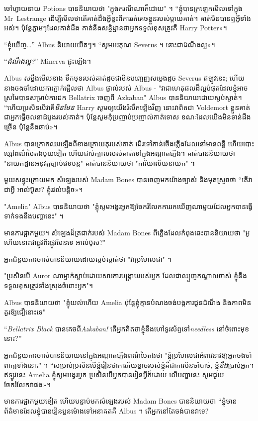 ចៅហ្វាយនាយ Potions បាននិយាយថា "ក្នុងករណីណាក៏ដោយ" ។ “ខ្ញុំបានក្រឡេកមើលទៅក្នុង Mr~Lestrange ដើម្បីមើលថាតើគាត់ដឹងអ្វីខ្លះពីការរត់គេចខ្លួនរបស់ម្តាយគាត់។ គាត់មិនបានឮអ្វីទាំងអស់។ ប៉ុន្តែ​ភ្លាមៗ​ដែល​គាត់​ដឹង គាត់​នឹង​សន្និដ្ឋាន​ថា​អ្នក​ទទួលខុសត្រូវ​គឺ Harry Potter»។

“ខ្ញុំឃើញ…” Albus និយាយយឺតៗ។ “សូមអរគុណ Severus ។ នោះ​ជា​ដំណឹង​ល្អ»។

“\emph{ដំណឹងល្អ?}” Minerva ផ្ទុះឡើង។

Albus សម្លឹងមើលនាង ទឹកមុខរបស់គាត់ដូចជាមិនបញ្ចេញសម្លេងដូច Severus ឥឡូវនេះ; ហើយនាងចងចាំដោយការភ្ញាក់ផ្អើលថា Albus ផ្ទាល់របស់ Albus - "វាជាហេតុផលដ៏ល្អបំផុតដែលខ្ញុំអាចស្រមៃបានសម្រាប់ការដក Bellatrix ចេញពី Azkaban" Albus បាននិយាយដោយស្ងប់ស្ងាត់។ “ហើយប្រសិនបើវាគឺ\emph{មិនមែន} Harry សូមឲ្យយើងរំលឹកឡើងវិញ នោះវាពិតជា Voldemort ខ្លួនគាត់ជាអ្នកធ្វើចលនាដំបូងរបស់គាត់។ ប៉ុន្តែ​សូម​កុំ​ប្រញាប់​ប្រញាល់​កាត់​ទោស ខណៈ​ដែល​យើង​មិន​ទាន់​ដឹង​ច្រើន ប៉ុន្តែ​នឹង​ឆាប់»។

Albus បានក្រោកឈរឡើងពីខាងក្រោយតុរបស់គាត់ ដើរទៅកាន់ចើងភ្លើងដែលនៅមានពន្លឺ ហើយបោះម្សៅពណ៌បៃតងមួយទៀត ហើយជាប់ក្បាលរបស់គាត់ទៅក្នុងអណ្តាតភ្លើង។ គាត់បាននិយាយថា "នាយកដ្ឋានអនុវត្តច្បាប់វេទមន្ត" គាត់បាននិយាយថា "ការិយាល័យនាយក" ។

មួយសន្ទុះក្រោយមក សំឡេងរបស់ Madam Bones បានចេញមកយ៉ាងច្បាស់ និងមុតស្រួចថា “តើវាជាអ្វី អាល់ប៊ូស? ខ្ញុំ​រវល់​បន្តិច»។

"Amelia" Albus បាននិយាយថា "ខ្ញុំសូមអង្វរអ្នកឱ្យចែករំលែកការរកឃើញណាមួយដែលអ្នកបានធ្វើទាក់ទងនឹងបញ្ហានេះ" ។

មានការផ្អាកមួយ។ សំឡេងដ៏ត្រជាក់របស់ Madam Bones ពីភ្លើងដែលកំពុងឆេះបាននិយាយថា "អូ ហើយនោះជាផ្លូវពីរផ្លូវមែនទេ អាល់ប៊ូស?"

អ្នកជំនួយការចាស់បាននិយាយដោយស្ងប់ស្ងាត់ថា "វាប្រហែលជា" ។

"ប្រសិនបើ Auror ណាម្នាក់ស្លាប់ដោយសារការបង្រ្កាបរបស់អ្នក ដែលជាឈ្មួញកណ្តាលចាស់ ខ្ញុំនឹងទទួលខុសត្រូវទាំងស្រុងចំពោះអ្នក"។

Albus បាននិយាយថា "ខ្ញុំយល់ហើយ Amelia ប៉ុន្តែខ្ញុំគ្មានបំណងចង់បង្កការជូនដំណឹង និងភាពមិនគួរឱ្យជឿនោះទេ"

“\emph{Bellatrix Black} បានគេចពី\emph{Azkaban!} តើអ្នកគិតថាខ្ញុំនឹងហៅទូរស័ព្ទទៅ\emph{needless} នៅចំពោះមុខនោះ?”

អ្នកជំនួយការចាស់បាននិយាយនៅក្នុងអណ្តាតភ្លើងពណ៌បៃតងថា "ខ្ញុំប្រហែលជាអំពាវនាវឱ្យអ្នកចងចាំពាក្យទាំងនោះ" ។ “សម្រាប់​ប្រសិន​បើ​ខ្ញុំ​រៀន​ថា​ការ​ភ័យ​ខ្លាច​របស់​ខ្ញុំ​គឺ​ជា​ការ​មិន​ចាំ​បាច់, ខ្ញុំ\emph{នឹង}ប្រាប់អ្នក។ ឥឡូវនេះ Amelia ខ្ញុំសូមអង្វរអ្នក ប្រសិនបើអ្នកបានរៀនអ្វីក៏ដោយ លើបញ្ហានេះ សូមជួយចែករំលែកវាផង»។

មាន​ការ​ផ្អាក​មួយ​ទៀត ហើយ​បន្ទាប់​មក​សំឡេង​របស់ Madam Bones បាន​និយាយ​ថា “ខ្ញុំ​មាន​ព័ត៌មាន​ដែល​ខ្ញុំ​បាន​រៀន​បួន​ម៉ោង​ទៅ​អនាគត​គឺ Albus ។ តើអ្នកនៅតែចង់បានវាទេ?

